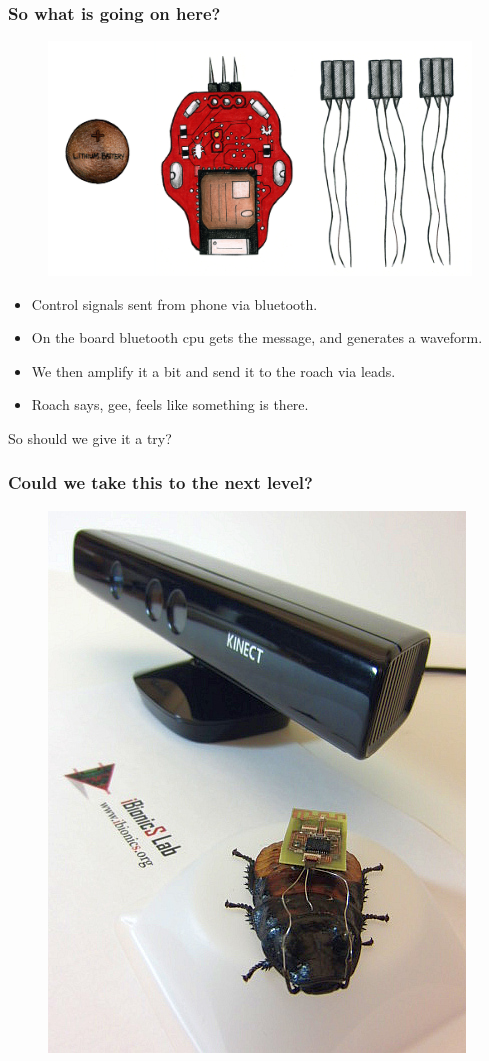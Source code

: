 \documentclass[compress]{beamer}
\begin{document}
\begin{frame}
  \frametitle{So what is going on here?} 
  \begin{figure}
    \includegraphics[width=0.7\linewidth]{box1.jpg}
  \end{figure}     
  \begin{itemize}
    \item Control signals sent from phone via bluetooth.
    \item On the board bluetooth cpu gets the message, and generates a waveform.
    \item We then amplify it a bit and send it to the roach via leads. 
    \item Roach says, gee, feels like something is there. 
  \end{itemize}
\end{frame}
\begin{frame}
  \huge{So should we give it a try?}
\end{frame}
\begin{frame}
  \frametitle{Could we take this to the next level?}
  \begin{figure}
    \href{http://www.youtube.com/watch?v=R-IzkGA9hTc}{\includegraphics[width=0.5\linewidth]{autopilot.jpg}}
  \end{figure}     
\end{frame}
\end{document}

